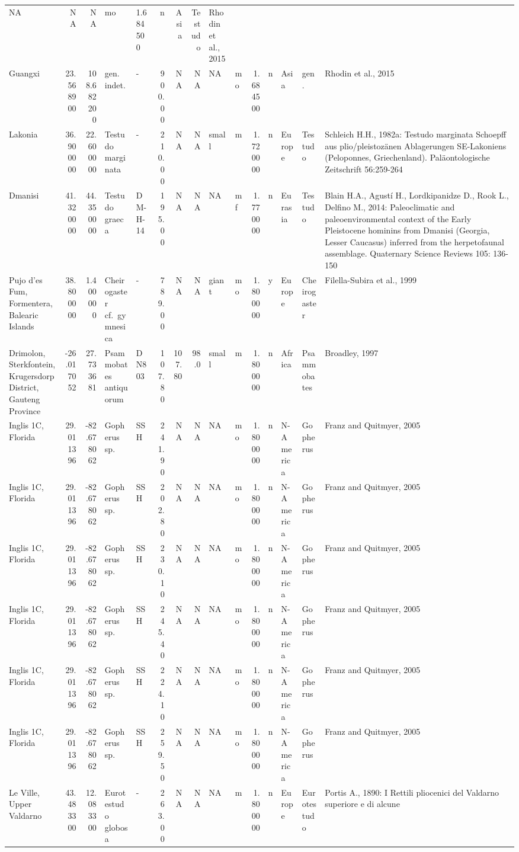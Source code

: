 \documentclass[]{article}
\begin{document}
\begin{longtable}[]{@{}lrrllrrrllrllll@{}}
NA & NA & NA & mo & 1.684500 & n & Asia & Testudo & Rhodin et al.,
2015\tabularnewline
Guangxi & 23.568900 & 108.682200 & gen. indet. & - & 900.00 & NA & NA &
NA & mo & 1.684500 & n & Asia & gen. & Rhodin et al.,
2015\tabularnewline
Lakonia & 36.900000 & 22.600000 & Testudo marginata & - & 210.00 & NA &
NA & small & m & 1.720000 & n & Europe & Testudo & Schleich H.H., 1982a:
Testudo marginata Schoepff aus plio/pleistozänen Ablagerungen
SE-Lakoniens (Peloponnes, Griechenland). Paläontologische Zeitschrift
56:259-264\tabularnewline
Dmanisi & 41.320000 & 44.350000 & Testudo graeca & DM-H-14 & 195.00 & NA
& NA & NA & mf & 1.770000 & n & Eurasia & Testudo & Blain H.A., Agustí
H., Lordkipanidze D., Rook L., Delfino M., 2014: Paleoclimatic and
paleoenvironmental context of the Early Pleistocene hominins from
Dmanisi (Georgia, Lesser Caucasus) inferred from the herpetofaunal
assemblage. Quaternary Science Reviews 105: 136-150\tabularnewline
Pujo d'es Fum, Formentera, Balearic Islands & 38.800000 & 1.400000 &
Cheirogaster cf.~gymnesica & - & 789.00 & NA & NA & giant & mo &
1.800000 & y & Europe & Cheirogaster & Filella-Subira et al.,
1999\tabularnewline
Drimolon, Sterkfontein, Krugersdorp District, Gauteng Province &
-26.017052 & 27.733681 & Psammobates antiquorum & DN803 & 107.80 &
107.80 & 98.0 & small & m & 1.800000 & n & Africa & Psammobates &
Broadley, 1997\tabularnewline
Inglis 1C, Florida & 29.011396 & -82.678062 & Gopherus sp. & SSH &
241.90 & NA & NA & NA & mo & 1.800000 & n & N-America & Gopherus & Franz
and Quitmyer, 2005\tabularnewline
Inglis 1C, Florida & 29.011396 & -82.678062 & Gopherus sp. & SSH &
202.80 & NA & NA & NA & mo & 1.800000 & n & N-America & Gopherus & Franz
and Quitmyer, 2005\tabularnewline
Inglis 1C, Florida & 29.011396 & -82.678062 & Gopherus sp. & SSH &
230.10 & NA & NA & NA & mo & 1.800000 & n & N-America & Gopherus & Franz
and Quitmyer, 2005\tabularnewline
Inglis 1C, Florida & 29.011396 & -82.678062 & Gopherus sp. & SSH &
245.40 & NA & NA & NA & mo & 1.800000 & n & N-America & Gopherus & Franz
and Quitmyer, 2005\tabularnewline
Inglis 1C, Florida & 29.011396 & -82.678062 & Gopherus sp. & SSH &
224.10 & NA & NA & NA & mo & 1.800000 & n & N-America & Gopherus & Franz
and Quitmyer, 2005\tabularnewline
Inglis 1C, Florida & 29.011396 & -82.678062 & Gopherus sp. & SSH &
259.50 & NA & NA & NA & mo & 1.800000 & n & N-America & Gopherus & Franz
and Quitmyer, 2005\tabularnewline
Le Ville, Upper Valdarno & 43.483300 & 12.083300 & Eurotestudo globosa &
- & 263.00 & NA & NA & NA & m & 1.800000 & n & Europe & Eurotestudo &
Portis A., 1890: I Rettili pliocenici del Valdarno superiore e di alcune

\end{longtable}
\end{document}
